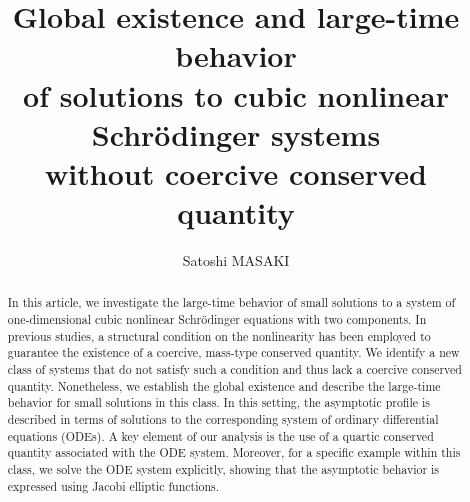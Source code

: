 \documentclass[11pt,a4paper,oneside]{amsart}
\theoremstyle{plain}
\theoremstyle{remark}
\numberwithin{equation}{section}
\theoremstyle{definition}
\begin{document}
\title[Cubic NLS Systems without Coercive Conserved Quantity]{
Global existence and large-time behavior\\ of solutions to cubic nonlinear Schr\"odinger systems\\ without coercive conserved quantity
}

\author[S. Masaki]{Satoshi MASAKI}
\address{Department of mathematics, 
Hokkaido University, Sapporo Hokkaido, 060-0810, Japan}
%
%


\begin{abstract}
In this article, we investigate the large-time behavior of small solutions to a system of one-dimensional cubic nonlinear Schr\"odinger equations with two components.
In previous studies, a structural condition on the nonlinearity has been employed to guarantee the existence of a coercive, mass-type conserved quantity.
We identify a new class of systems that do not satisfy such a condition and thus lack a coercive conserved quantity. Nonetheless, we establish the global existence and describe the large-time behavior for small solutions in this class.
In this setting, the asymptotic profile is described in terms of solutions to the corresponding system of ordinary differential equations (ODEs).
A key element of our analysis is the use of a quartic conserved quantity associated with the ODE system.
Moreover, for a specific example within this class, we solve the ODE system explicitly, showing that the asymptotic behavior is expressed using Jacobi elliptic functions.


\end{abstract}
\end{document}
